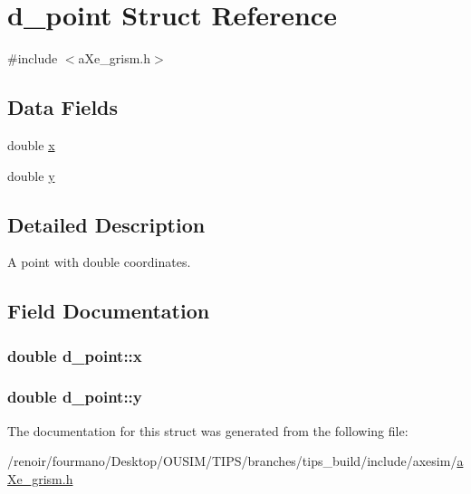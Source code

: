 \hypertarget{structd__point}{
\section{d\_\-point Struct Reference}
\label{structd__point}
}


{\ttfamily \#include $<$aXe\_\-grism.h$>$}\subsection*{Data Fields}
\begin{DoxyCompactItemize}
\item 
double \hyperlink{structd__point_a922a3b5d82a119168ba85e5f939d02c3}{x}
\item 
double \hyperlink{structd__point_ad9846a025508bf8873a501ca5fcefbf4}{y}
\end{DoxyCompactItemize}


\subsection{Detailed Description}
A point with double coordinates. 

\subsection{Field Documentation}
\hypertarget{structd__point_a922a3b5d82a119168ba85e5f939d02c3}{
\subsubsection[{x}]{\setlength{\rightskip}{0pt plus 5cm}double {\bf d\_\-point::x}}}
\label{structd__point_a922a3b5d82a119168ba85e5f939d02c3}
\hypertarget{structd__point_ad9846a025508bf8873a501ca5fcefbf4}{
\subsubsection[{y}]{\setlength{\rightskip}{0pt plus 5cm}double {\bf d\_\-point::y}}}
\label{structd__point_ad9846a025508bf8873a501ca5fcefbf4}


The documentation for this struct was generated from the following file:\begin{DoxyCompactItemize}
\item 
/renoir/fourmano/Desktop/OUSIM/TIPS/branches/tips\_\-build/include/axesim/\hyperlink{aXe__grism_8h}{aXe\_\-grism.h}\end{DoxyCompactItemize}
